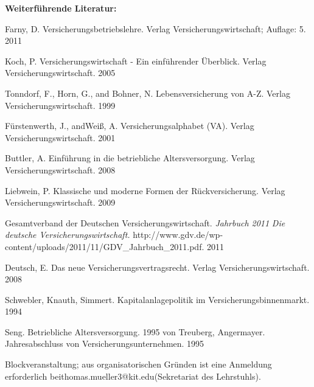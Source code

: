 \begin{course}
\begin{content}
\end{content}



\begin{literature}\textbf{Weiterführende Literatur:}

 

Farny, D. Versicherungsbetriebslehre. Verlag Versicherungswirtschaft; Auflage: 5. 2011

 

Koch, P. Versicherungswirtschaft - Ein einführender Überblick. Verlag Versicherungswirtschaft. 2005

 

Tonndorf, F., Horn, G., and Bohner, N. Lebensversicherung von A-Z. Verlag Versicherungswirtschaft. 1999

 

Fürstenwerth, J., andWeiß, A. Versicherungsalphabet (VA). Verlag Versicherungswirtschaft. 2001

 

Buttler, A. Einführung in die betriebliche Altersversorgung. Verlag Versicherungswirtschaft. 2008

 

Liebwein, P. Klassische und moderne Formen der Rückversicherung. Verlag Versicherungswirtschaft. 2009

 

Gesamtverband der Deutschen Versicherungswirtschaft. \emph{Jahrbuch 2011 }\emph{Die deutsche Versicherungswirtschaft.} \newline
http://www.gdv.de/wp-content/uploads/2011/11/GDV\_Jahrbuch\_2011.pdf. 2011

 

Deutsch, E. Das neue Versicherungsvertragsrecht. Verlag Versicherungswirtschaft. 2008

 

Schwebler, Knauth, Simmert. Kapitalanlagepolitik im Versicherungsbinnenmarkt. 1994

 

Seng. Betriebliche Altersversorgung. 1995\newline
von Treuberg, Angermayer. Jahresabschluss von Versicherungsunternehmen. 1995

\end{literature}

\begin{remarks}Blockveranstaltung; aus organisatorischen Gründen ist eine Anmeldung erforderlich beithomas.mueller3@kit.edu(Sekretariat des Lehrstuhls).

\end{remarks}

\end{course}